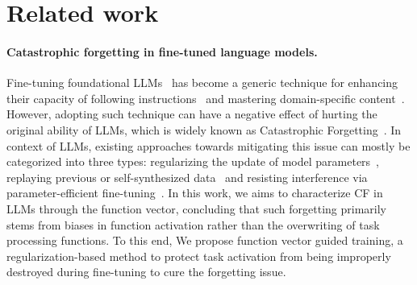
\section{Related work}


\paragraph{Catastrophic forgetting in fine-tuned language models.}
Fine-tuning foundational LLMs~\citep{touvron2023llama_1,touvron2023llama} has become a generic technique for enhancing their capacity of following instructions~\citep{wei2022finetuned,zhang2024llamaadapter,zhang2024instruction} and mastering domain-specific content~\citep{yue2023disclawllm,christophe2024med42}. 
However, adopting such technique can have a negative effect of hurting the original ability of LLMs, which is widely known as Catastrophic Forgetting~\citep{Kirkpatrick_2017,luo2024empirical,kotha2024understanding,wu2024continual}.
In context of LLMs, existing approaches towards mitigating this issue can mostly be categorized into three types: regularizing the update of model parameters~\citep{huang-etal-2021-continual,cha2021cpr}, replaying previous or self-synthesized data~\citep{scialom-etal-2022-fine,huang2024mitigating} and resisting interference via parameter-efficient fine-tuning~\citep{razdaibiedina2023progressive,wang2023orthogonal}.
In this work, we aims to characterize CF in LLMs through the function vector, concluding that such forgetting primarily stems from biases in function activation
rather than the overwriting of task processing functions. To this end, We propose function vector guided training, a regularization-based method to protect task activation from being improperly destroyed during fine-tuning to cure the forgetting issue.
